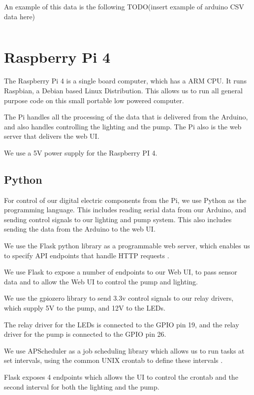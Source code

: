 \documentclass[a4paper,12pt,twoside,openright,titlepage]{book}
\begin{document}
An example of this data is the following
TODO(insert example of arduino CSV data here)
\begin{verbatim}
\end{verbatim}

\section{Raspberry Pi 4}
The Raspberry Pi 4 is a single board computer, which has a ARM CPU.
It runs Raspbian, a Debian based Linux Distribution.
This allows us to run all general purpose code on this small portable low powered computer.

The Pi handles all the processing of the data that is delivered from the Arduino, and also handles controlling the lighting and the pump.
The Pi also is the web server that delivers the web UI.

We use a 5V power supply for the Raspberry PI 4.

\subsection{Python}
For control of our digital electric components from the Pi, we use Python as the programming language.
This includes reading serial data from our Arduino, and sending control signals to our lighting and pump system. This also includes sending the data from the Arduino to the web UI.

We use the Flask python library as a programmable web server, which enables us to specify API endpoints that handle HTTP requests \cite{flask}.

We use Flask to expose a number of endpoints to our Web UI, to pass sensor data and to allow the Web UI to control the pump and lighting.

\bigskip

We use the gpiozero library to send 3.3v control signals to our relay drivers, which supply 5V to the pump, and 12V to the LEDs.

The relay driver for the LEDs is connected to the GPIO pin 19, and the relay driver for the pump is connected to the GPIO pin 26.

\bigskip

We use APScheduler as a job scheduling library which allows us to run tasks at set intervals, using the common UNIX crontab to define these intervals \cite{apscheduler}.

Flask exposes 4 endpoints which allows the UI to control the crontab and the second interval for both the lighting and the pump.
\end{document}
